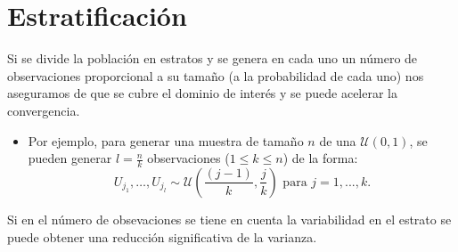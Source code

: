 \documentclass[
  spanish,
  10pt,
]{book}
\providecommand{\tightlist}{%
  \setlength{\itemsep}{0pt}\setlength{\parskip}{0pt}}
\theoremstyle{break}
\theoremstyle{nonumberplain}
\begin{document}
\section{Estratificación}\label{estratificaciuxf3n}

Si se divide la población en estratos y se genera en cada uno un
número de observaciones proporcional a su tamaño (a la probabilidad de cada uno) nos
aseguramos de que se cubre el dominio de interés y se puede acelerar
la convergencia.

\begin{itemize}
\tightlist
\item
  Por ejemplo, para generar una muestra de tamaño \(n\) de una
  \(\mathcal{U}\left(  0,1\right)\), se pueden generar \(l=\frac{n}{k}\)
  observaciones (\(1\leq k\leq n\)) de la forma:
  \[U_{j_{1}},\ldots,U_{j_{l}}\sim \mathcal{U}\left(  \frac{(j-1)}{k},\frac{j}{k}\right)  \text{ para }j=1,...,k.\]
\end{itemize}

Si en el número de obsevaciones se tiene en cuenta la
variabilidad en el estrato se puede obtener una reducción
significativa de la varianza.
\end{document}

